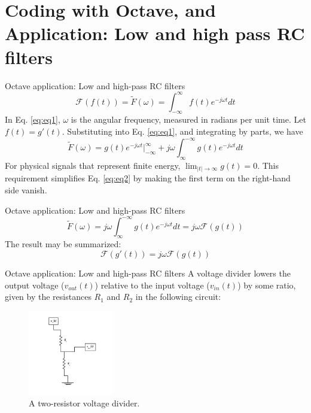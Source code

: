 \documentclass{beamer}
\begin{document}
\section{Coding with Octave, and Application: Low and high pass RC filters}

\begin{frame}{Octave application: Low and high-pass RC filters}
\small
\begin{equation}
\mathcal{F}(f(t)) = \tilde{F}(\omega) = \int_{-\infty}^{\infty} f(t) e^{-j\omega t} dt
\label{eq:eq1}
\end{equation}
In Eq. \ref{eq:eq1}, $\omega$ is the angular frequency, measured in radians per unit time.  Let $f(t) = g'(t)$.  Substituting into Eq. \ref{eq:eq1}, and integrating by parts, we have
\begin{equation}
\tilde{F}(\omega) = g(t) e^{-j\omega t} |_{-\infty}^{\infty} + j\omega \int_{\infty}^{-\infty} g(t)  e^{-j\omega t} dt
\label{eq:eq2}
\end{equation}
For physical signals that represent finite energy, $\lim_{|t|\rightarrow\infty} g(t) = 0$.  This requirement simplifies Eq. \ref{eq:eq2} by making the first term on the right-hand side vanish.
\end{frame}

\begin{frame}{Octave application: Low and high-pass RC filters}
\small
\begin{equation}
\tilde{F}(\omega) = j\omega \int_{\infty}^{-\infty} g(t)  e^{-j\omega t} dt = j\omega\mathcal{F}(g(t))
\end{equation}
The result may be summarized:
\begin{equation}
\boxed{
\mathcal{F}(g'(t)) = j\omega\mathcal{F}(g(t))
}
\end{equation}
\end{frame}

\begin{frame}{Octave application: Low and high-pass RC filters}
\small
A voltage divider lowers the output voltage ($v_{out}(t)$) relative to the input voltage ($v_{in}(t)$) by some ratio, given by the resistances $R_1$ and $R_2$ in the following circuit:
\begin{figure}
\centering
\includegraphics[width=0.33\textwidth,trim=0cm 1cm 0cm 0cm,clip=true]{figures/VoltageDivider.pdf}
\caption{\label{fig:fig1} A two-resistor voltage divider.}
\end{figure}
\end{frame}
\end{document}
